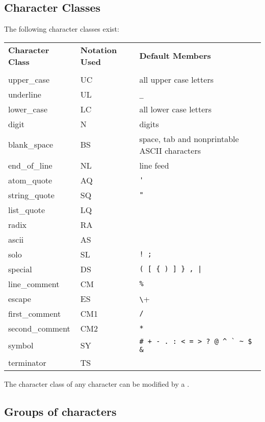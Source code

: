 \subsection{Character Classes}
\label{charclass}

The following character classes exist:
\vspace{0.3cm}

\begin{tabular}{lll}
{\bf Character Class}   &       {\bf Notation Used }    & {\bf Default Members} \\
\\
upper\_case     &       UC      &all upper case letters\\
underline       &       UL      &\verb+_+\\
lower\_case     &       LC      &all lower case letters\\
digit           &       N       &digits\\
blank\_space    &       BS      &space, tab and nonprintable ASCII characters\\
end\_of\_line   &       NL      &line feed\\
atom\_quote     &       AQ      &\verb+'+\\
string\_quote   &       SQ      &\verb+"+\\
list\_quote     &       LQ      & \\
radix           &       RA      & \\
ascii           &       AS      & \\
solo            &       SL      &\verb+! ; +\\
special         &       DS      &\verb+( [ { ) ] } , | +\\
line\_comment   &       CM      &\verb+%+\\
escape          &       ES      &\verb+\+\\
first\_comment  &       CM1     &\verb+/+\\
second\_comment &       CM2     &\verb+*+\\
symbol          &       SY      &\verb/# + - . : < = > ? @ ^ ` ~ $ & /\\
terminator      &       TS      & \\
\end{tabular}

The character class of any character can be modified by a
.


\subsection{Groups of characters}

